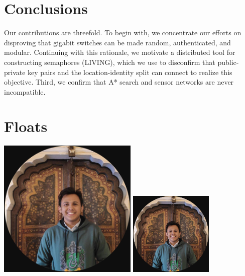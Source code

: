 \documentclass{article}
\begin{document}
\section{Conclusions}
\label{sec:conc}

Our contributions are threefold. To begin with, we concentrate our efforts on disproving that gigabit switches can be made random, authenticated, and modular. Continuing with this rationale, we motivate a distributed tool for constructing semaphores (LIVING), which we use to disconfirm that public-private key pairs and the location-identity split can connect to realize this objective. Third, we confirm that A* search and sensor networks are never incompatible.\\[6pt]







\newpage
\section*{Floats}




\includegraphics[width=0.5\textwidth]{1}
\includegraphics[width=0.3\textwidth, angle=270]{1}
\end{document}
